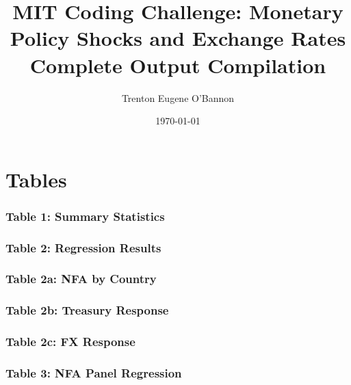 \documentclass[11pt]{article}
\title{\textbf{MIT Coding Challenge: Monetary Policy Shocks and Exchange Rates}\\[0.5em]
\large Complete Output Compilation}
\author{Trenton Eugene O'Bannon}
\date{\today}
\begin{document}
\maketitle

\tableofcontents
\clearpage

\clearpage
\part{Tables}
\clearpage

\section{Table 1: Summary Statistics}


\clearpage
\section{Table 2: Regression Results}


\clearpage
\section{Table 2a: NFA by Country}


\clearpage
\section{Table 2b: Treasury Response}


\clearpage
\section{Table 2c: FX Response}


\clearpage
\section{Table 3: NFA Panel Regression}

\end{document}
